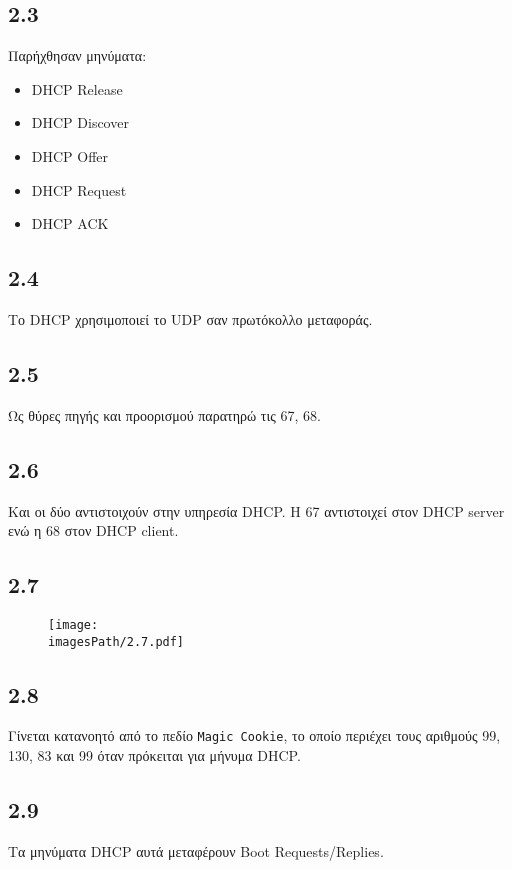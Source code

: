 		\subsection*{2.3}
			Παρήχθησαν μηνύματα:
			
			\begin{itemize}
				\item DHCP Release
				\item DHCP Discover 
				\item DHCP Offer
				\item DHCP Request
				\item DHCP ACK
			\end{itemize}

		\subsection*{2.4}
			Το DHCP χρησιμοποιεί το UDP σαν πρωτόκολλο μεταφοράς.

		\subsection*{2.5}
			Ως θύρες πηγής και προορισμού παρατηρώ τις 67, 68.

		\subsection*{2.6}
			Και οι δύο αντιστοιχούν στην υπηρεσία DHCP. Η 67 αντιστοιχεί στον DHCP server ενώ η 68 στον DHCP client. 

		\subsection*{2.7}
			\begin{figure}[H]
				\texttt{[image: \\imagesPath/2.7.pdf]}
			\end{figure}

		\subsection*{2.8}
			Γίνεται κατανοητό από το πεδίο \verb|Magic Cookie|, το οποίο περιέχει τους αριθμούς 99, 130, 83 και 99 όταν πρόκειται για μήνυμα DHCP.

		\subsection*{2.9}
			Τα μηνύματα DHCP αυτά μεταφέρουν Boot Requests/Replies.

